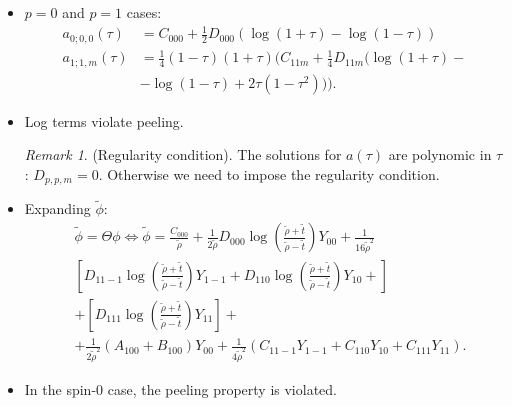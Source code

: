 \documentclass{beamer}
\theoremstyle{remark}
\newtheorem{remark}{Remark}
\theoremstyle{plain}
\theoremstyle{plain}
\begin{document}
\begin{frame}
  \begin{itemize}
    \item $p = 0$ and $p = 1$ cases:
    \begin{align}
      {a}_{0;0,0}(\tau) & = C_{000} + \tfrac{1}{2} D_{000} (\log(1 + \tau)- \log(1 - \tau )) \nonumber \\ 
      {a}_{1;1,m}(\tau) & = \tfrac{1}{4} (1 - \tau )(1 + \tau ) (C_{11m} + \tfrac{1}{4} D_{11m}( \log(1 + \tau ) - \nonumber \\
      & -\log(1 - \tau ) + 2\tau(1-\tau^2))). \nonumber 
    \end{align}
    \item Log terms violate peeling.
    \vspace{5mm}
    \begin{remark}\label{Remark:logfreeRemark}(Regularity condition).
      The solutions for $a(\tau)$ are polynomic in $\tau$: $D_{p,p,m} = 0$. Otherwise we need to impose the regularity condition.
    \end{remark}
  \end{itemize}
\end{frame}

\begin{frame}
  \begin{itemize}
    \item Expanding $\tilde{\phi}$:
    \begin{align}\label{eq:phi_tilde}
      & \tilde{\phi}=\Theta \phi \Leftrightarrow \tilde{\phi}=\frac{C_{000}}{\tilde{\rho}}+\frac{1}{2 \tilde{\rho}} D_{000} \log \left(\frac{\tilde{\rho}+\tilde{t}}{\tilde{\rho}-\tilde{t}}\right) Y_{00} + \frac{1}{16{\tilde{\rho}^2}} \nonumber \\
      & \left[D_{11-1}\log \left(\frac{\tilde{\rho}+\tilde{t}}{\tilde{\rho}-\tilde{t}}\right) Y_{1-1}+D_{110} \log\left(\frac{\tilde{\rho}+\tilde{t}}{\tilde{\rho}-\tilde{t}}\right) Y_{10}+\right] \nonumber \\
      & +\left[D_{111} \log\left(\frac{\tilde{\rho}+\tilde{t}}{\tilde{\rho}-\tilde{t}}\right)Y_{11}\right] + \nonumber \\
      & + \frac{1}{2 \tilde{\rho}^2}\left(A_{100}+B_{100}\right) Y_{00}+\frac{1}{4 \tilde{\rho}^2}\left(C_{11-1} Y_{1-1}+C_{110} Y_{10}+C_{111} Y_{11}\right). \nonumber 
    \end{align}
    \item In the spin-0 case, the peeling property is violated.
  \end{itemize}
\end{frame}
\end{document}
